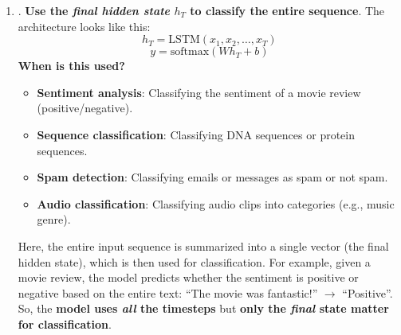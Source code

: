 \begin{enumerate}
    \item {}. \textbf{Use the \emph{final hidden state} $h_T$ to classify the entire sequence}. The architecture looks like this:
    \begin{equation*}
        h_{T} = \text{LSTM}\left(x_1, x_2, \ldots, x_T\right)
    \end{equation*}
    \begin{equation*}
        y = \text{softmax}\left(W h_T + b\right)
    \end{equation*}
    \textcolor{Green3}{ \textbf{When is this used?}}
    \begin{itemize}
        \item \textbf{Sentiment analysis}: Classifying the sentiment of a movie review (positive/negative).
        \item \textbf{Sequence classification}: Classifying DNA sequences or protein sequences.
        \item \textbf{Spam detection}: Classifying emails or messages as spam or not spam.
        \item \textbf{Audio classification}: Classifying audio clips into categories (e.g., music genre).
    \end{itemize}
    Here, the entire input sequence is summarized into a single vector (the final hidden state), which is then used for classification. For example, given a movie review, the model predicts whether the sentiment is positive or negative based on the entire text: ``The movie was fantastic!'' $\to$ ``Positive''. So, the \textbf{model uses \emph{all} the timesteps} but \textbf{only the \emph{final} state matter for classification}.



\end{enumerate}
